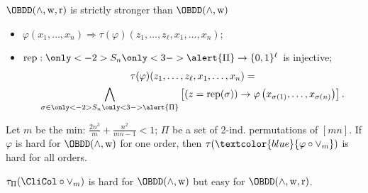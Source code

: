 \begin{frame}{$\OBDD(\land, \weakening, \reordering)$ is strictly stronger than $\OBDD(\land, \weakening)$}

    \pause

    \begin{itemize}
        \item $\varphi(x_1, \dots, x_n) \Rightarrow \tau(\varphi)(z_1,
            \dots, z_{\ell}, x_1, \dots, x_n)$;
        \item $\mathrm{rep}: \only<-2>{S_n}\only<3->{\alert{\Pi}} \to \{0, 1\}^{\ell}$ is injective;
        \begin{multline*}
            \tau(\varphi)(z_1, \dots, z_{\ell}, x_1, \dots, x_n) = \\
            \bigwedge\limits_{\sigma \in \only<-2>{S_n}\only<3->{\alert{\Pi}}} \left[\left( z =
                \mathrm{rep}(\sigma) \right) \to \varphi\left(x_{\sigma(1)}, \dots, x_{\sigma(n)}\right)
            \right].
        \end{multline*}
    \end{itemize}

    \pause
    \pause

    \begin{theorem}[Segerlind 07]
        Let $m$ be the min: $\frac{2n^3}{m} + \frac{n^2}{mn - 1}  < 1$; $\Pi$ be a set of
        2-ind. permutations of $[mn]$. If $\varphi$ is hard for $\OBDD(\land, \weakening)$ for one order,
        then $\tau(\textcolor{blue}{\varphi \circ \lor_m})$ is hard for all orders.
    \end{theorem}

    \pause
    \begin{corollary}
        $\tau_{\Pi}(\CliCol \circ \lor_m)$ is hard for $\OBDD(\land, \weakening)$ but easy for
        $\OBDD(\land, \weakening, \reordering)$. 
    \end{corollary}
\end{frame}